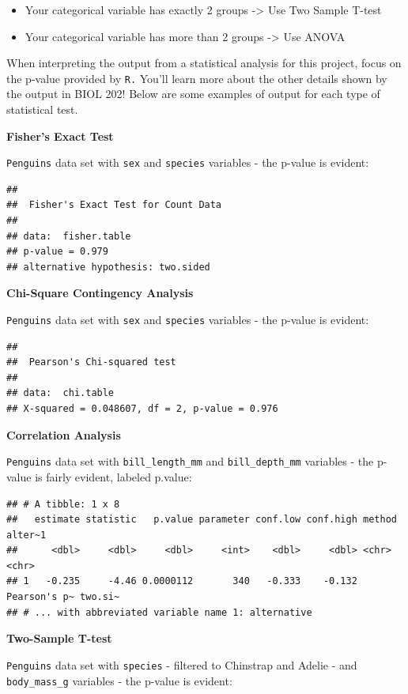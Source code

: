 \documentclass[
]{book}
\providecommand{\tightlist}{%
  \setlength{\itemsep}{0pt}\setlength{\parskip}{0pt}}
\begin{document}
\begin{itemize}
\tightlist
\item
  Your categorical variable has exactly 2 groups -\textgreater{} Use Two Sample T-test
\item
  Your categorical variable has more than 2 groups -\textgreater{} Use ANOVA
\end{itemize}

When interpreting the output from a statistical analysis for this project, focus on the p-value provided by \texttt{R.} You'll learn more about the other details shown by the output in BIOL 202! Below are some examples of output for each type of statistical test.

\textbf{Fisher's Exact Test}

\texttt{Penguins} data set with \texttt{sex} and \texttt{species} variables - the p-value is evident:

\begin{verbatim}
## 
##  Fisher's Exact Test for Count Data
## 
## data:  fisher.table
## p-value = 0.979
## alternative hypothesis: two.sided
\end{verbatim}

\textbf{Chi-Square Contingency Analysis}

\texttt{Penguins} data set with \texttt{sex} and \texttt{species} variables - the p-value is evident:

\begin{verbatim}
## 
##  Pearson's Chi-squared test
## 
## data:  chi.table
## X-squared = 0.048607, df = 2, p-value = 0.976
\end{verbatim}

\textbf{Correlation Analysis}

\texttt{Penguins} data set with \texttt{bill\_length\_mm} and \texttt{bill\_depth\_mm} variables - the p-value is fairly evident, labeled p.value:

\begin{verbatim}
## # A tibble: 1 x 8
##   estimate statistic   p.value parameter conf.low conf.high method       alter~1
##      <dbl>     <dbl>     <dbl>     <int>    <dbl>     <dbl> <chr>        <chr>  
## 1   -0.235     -4.46 0.0000112       340   -0.333    -0.132 Pearson's p~ two.si~
## # ... with abbreviated variable name 1: alternative
\end{verbatim}

\textbf{Two-Sample T-test}

\texttt{Penguins} data set with \texttt{species} - filtered to Chinstrap and Adelie - and \texttt{body\_mass\_g} variables - the p-value is evident:
\end{document}
